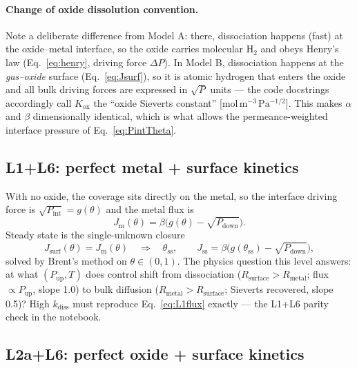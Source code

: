 \documentclass[11pt,a4paper]{article}
\newcommand{\Pup}{P_{\mathrm{up}}}
\newcommand{\Pdown}{P_{\mathrm{down}}}
\newcommand{\Pint}{P_{\mathrm{int}}}
\newcommand{\Kox}{K_{\mathrm{ox}}}
\newcommand{\kdiss}{k_{\mathrm{diss}}}
\newcommand{\Rsurf}{R_{\mathrm{surface}}}
\newcommand{\Rmet}{R_{\mathrm{metal}}}
\begin{document}
\paragraph{Change of oxide dissolution convention.}
\label{sec:oxideconvention}
Note a deliberate difference from Model A: there, dissociation happens (fast)
at the oxide--metal interface, so the oxide carries molecular $\mathrm{H_2}$
and obeys Henry's law (Eq.~\eqref{eq:henry}, driving force $\Delta P$). In
Model B, dissociation happens at the \emph{gas--oxide} surface
(Eq.~\eqref{eq:Jsurf}), so it is atomic hydrogen that enters the oxide and
all bulk driving forces are expressed in $\sqrt{P}$ units --- the code
docstrings accordingly call $\Kox$ the ``oxide Sieverts constant''
[$\mathrm{mol\,m^{-3}\,Pa^{-1/2}}$]. This makes $\alpha$ and $\beta$
dimensionally identical, which is what allows the permeance-weighted
interface pressure of Eq.~\eqref{eq:PintTheta}.

\subsection{L1+L6: perfect metal + surface kinetics}

With no oxide, the coverage sits directly on the metal, so the interface
driving force is $\sqrt{\Pint} = g(\theta)$ and the metal flux is
\begin{equation}
  J_{\mathrm{m}}(\theta) = \beta\bigl(g(\theta) - \sqrt{\Pdown}\bigr).
  \label{eq:JmL1L6}
\end{equation}
Steady state is the single-unknown closure
\begin{equation}
  J_{\mathrm{surf}}(\theta) = J_{\mathrm{m}}(\theta)
  \quad\Longrightarrow\quad \theta_{\mathrm{ss}},
  \qquad
  J_{\mathrm{ss}} = \beta\bigl(g(\theta_{\mathrm{ss}}) - \sqrt{\Pdown}\bigr),
  \label{eq:closureL1L6}
\end{equation}
solved by Brent's method on $\theta \in (0,1)$. The physics question this
level answers: at what $(\Pup, T)$ does control shift from dissociation
($\Rsurf > \Rmet$; flux $\propto \Pup$, slope 1.0) to bulk diffusion
($\Rmet > \Rsurf$; Sieverts recovered, slope 0.5)? High $\kdiss$ must
reproduce Eq.~\eqref{eq:L1flux} exactly --- the L1+L6 parity check in the
notebook.

\subsection{L2a+L6: perfect oxide + surface kinetics}
\end{document}
